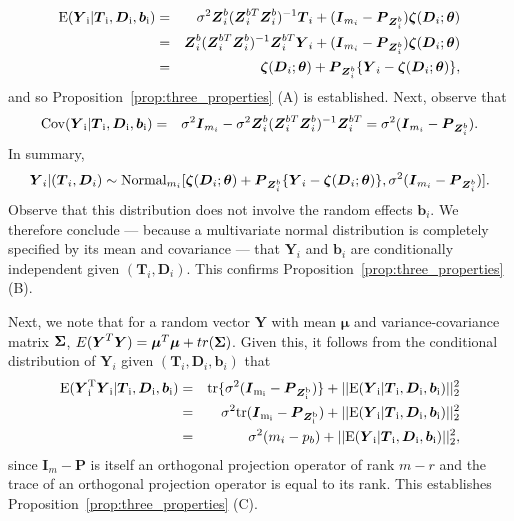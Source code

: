 \documentclass[12pt]{article}
\def\Normal{\hbox{Normal}}
\def\bse{\begin{eqnarray*}}
\def\ese{\end{eqnarray*}}
\def\bse{\begin{eqnarray*}}
\def\ese{\end{eqnarray*}}
\newcommand{\bzeta}{\mbox{\boldmath $\zeta$}}
\newcommand{\bSigma}{\mbox{\boldmath $\Sigma$}}
\def\bmu{{\boldsymbol{\mu}}}
\def\btheta{{\boldsymbol{\theta}}}
\def\bb{{\boldsymbol b}}
\def\bD{{\boldsymbol D}}
\def\bI{{\boldsymbol I}}
\def\bP{{\boldsymbol P}}
\def\bT{{\boldsymbol T}}
\def\bY{{\boldsymbol Y}}
\def\bZ{{\boldsymbol Z}}
\def\tilD{\bD}
\begin{document}
\bse
\rm{E}(\bY_i|\bT_i,\tilD_i,\bb_i)&=&
\sigma^2\bZ_i^b(\bZ_i^{bT}\bZ_i^b)^{-1}\bT_i + (\bI_{m_i} - \bP_{\bZ_i^b})\bzeta(\tilD_i;\btheta)\\
&=&\bZ_i^b(\bZ_i^{bT}\bZ_i^b)^{-1}\bZ^{bT}_i\bY_i + (\bI_{m_i} - \bP_{\bZ_i^b})\bzeta(\tilD_i;\btheta)\\
&=&\bzeta(\tilD_i;\btheta)+\bP_{\bZ_i^b}\{\bY_i-\bzeta(\tilD_i;\btheta)\},
\ese
and so Proposition~\ref{prop:three_properties} (A) is established. Next, observe that
\bse
\rm{Cov}(\bY_i|\bT_i,\tilD_i,\bb_i)&=&\sigma^2\bI_{m_i} - \sigma^2\bZ_i^b(\bZ_i^{bT}\bZ_i^b)^{-1}\bZ_i^{bT} =\sigma^2(\bI_{m_i} - \bP_{\bZ_i^b}).
\ese
In summary,
\bse
\bY_i | (\bT_i,\tilD_i) \sim \Normal_{m_i}[\bzeta(\tilD_i;\btheta)+\bP_{\bZ_i^b}\{\bY_i-\bzeta(\tilD_i;\btheta)\}, \sigma^2(\bI_{m_i} - \bP_{\bZ_i^b})].
\ese
Observe that this distribution does not involve the random effects $\bb_i$. We therefore conclude --- because a multivariate normal distribution is completely specified by its mean and covariance --- that $\bY_i$ and $\bb_i$ are conditionally independent given $(\bT_i,\tilD_i)$. This confirms Proposition~\ref{prop:three_properties} (B). 


Next, we note that for a random vector $\bY$ with mean $\bmu$ and variance-covariance matrix $\bSigma$, $E(\bY^T\bY) = \bmu^T\bmu + tr(\bSigma)$. Given this, it follows from the conditional distribution of $\bY_i$ given $(\bT_i, \tilD_i,\bb_i)$ that 
\bse
\rm{E}(\bY_i^T\bY_i|\bT_i,\tilD_i,\bb_i)&=&\rm{tr}\{\sigma^2(\bI_{m_i}-\bP_{\bZ_i^b})\}+||\rm{E}(\bY_i|\bT_i,\tilD_i,\bb_i)||^2_2\\
&=&\sigma^2\rm{tr}(\bI_{m_i}-\bP_{\bZ_i^b})+||\rm{E}(\bY_i|\bT_i,\tilD_i,\bb_i)||^2_2\\
&=&\sigma^2(m_i-p_b)+||\rm{E}(\bY_i|\bT_i,\tilD_i,\bb_i)||^2_2,
\ese
since $\bI_m - \bP$ is itself an orthogonal projection operator of rank $m-r$ and the trace of an orthogonal projection operator is equal to its rank. This establishes Proposition~\ref{prop:three_properties} (C).
\end{document}
